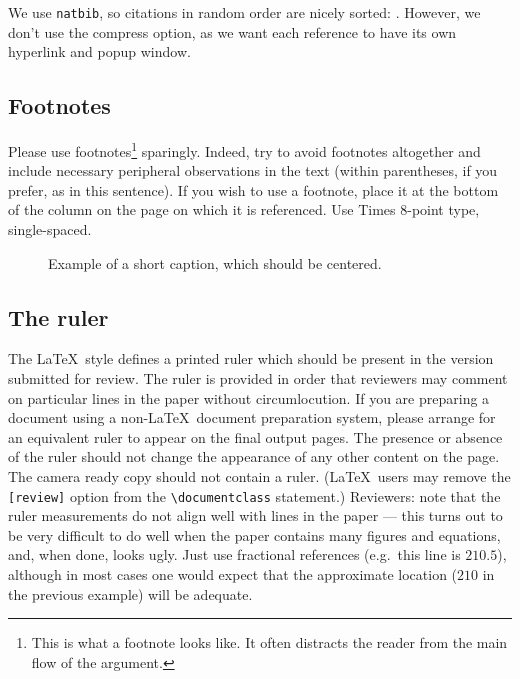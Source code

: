 \documentclass{bmvc2k}
\begin{document}
We use {\tt natbib}, so citations in random order are nicely sorted:
 \cite{Alpher03,Alpher02,Authors06b,Authors06}.  However, we don't use the
compress option, as we want each reference to have its own hyperlink and
popup window.

\subsection{Footnotes}

Please use footnotes\footnote {This is what a footnote looks like.  It
often distracts the reader from the main flow of the argument.} sparingly.
Indeed, try to avoid footnotes altogether and include necessary peripheral
observations in
the text (within parentheses, if you prefer, as in this sentence).  If you
wish to use a footnote, place it at the bottom of the column on the page on
which it is referenced. Use Times 8-point type, single-spaced.


\begin{figure}
\begin{center}
\fbox{\rule{0pt}{2in} \rule{.9\linewidth}{0pt}}
\end{center}
   \caption{Example of a short caption, which should be centered.}
\label{fig:short}
\end{figure}

\subsection{The ruler}
The \LaTeX\ style defines a printed ruler which should be present in the
version submitted for review.  The ruler is provided in order that
reviewers may comment on particular lines in the paper without
circumlocution.  If you are preparing a document using a non-\LaTeX\
document preparation system, please arrange for an equivalent ruler to
appear on the final output pages.  The presence or absence of the ruler
should not change the appearance of any other content on the page.  The
camera ready copy should not contain a ruler. (\LaTeX\ users may remove
the \verb'[review]' option from the \verb'\documentclass' statement.)
Reviewers: note that the ruler measurements do not align well with lines
in the paper --- this turns out to be very difficult to do well when the
paper contains many figures and equations, and, when done, looks ugly.
Just use fractional references (e.g.\ this line is $210.5$), although in
most cases one would expect that the approximate location ($210$ in the
previous example) will be adequate.
\end{document}
